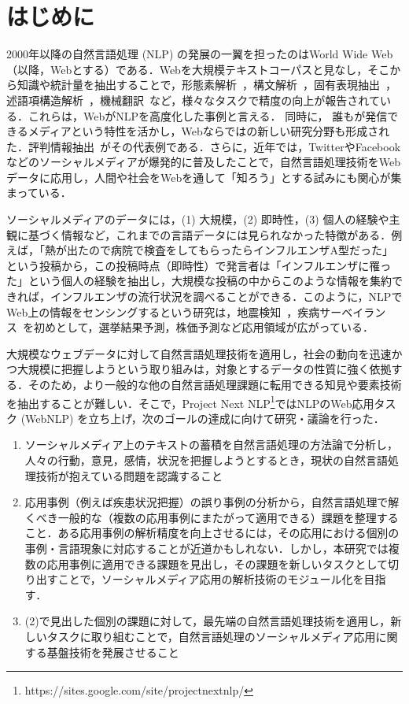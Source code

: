 \documentclass[japanese]{jnlp_1.4}
\begin{document}
\maketitle


\section{はじめに}

2000年以降の自然言語処理 (NLP) の発展の一翼を担ったのはWorld Wide Web（以降，Webとする）である．Webを大規模テキストコーパスと見なし，そこから知識や統計量を抽出することで，形態素解析~\cite{Kaji:2009,sato2015mecabipadicneologd}，構文解析~\cite{Kawahara:05}，固有表現抽出~\cite{Kazama:07}，述語項構造解析~\cite{Komachi:10,Sasano:10}，機械翻訳~\cite{Munteanu:06}など，様々なタスクで精度の向上が報告されている．これらは，WebがNLPを高度化した事例と言える．
同時に， 誰もが発信できるメディアという特性を活かし，Webならではの新しい研究分野も形成された．評判情報抽出~\cite{Pang:2002}がその代表例である．さらに，近年では，TwitterやFacebookなどのソーシャルメディアが爆発的に普及したことで，自然言語処理技術をWebデータに応用し，人間や社会をWebを通して「知ろう」とする試みにも関心が集まっている．

ソーシャルメディアのデータには，(1) 大規模，(2) 即時性，(3) 個人の経験や主観に基づく情報など，これまでの言語データには見られなかった特徴がある．例えば，「熱が出たので病院で検査をしてもらったらインフルエンザA型だった」という投稿から，この投稿時点（即時性）で発言者は「インフルエンザに罹った」という個人の経験を抽出し，大規模な投稿の中からこのような情報を集約できれば，インフルエンザの流行状況を調べることができる．このように，NLPでWeb上の情報をセンシングするという研究は，地震検知~\cite{Sakaki:10}，疾病サーベイランス~\cite{Culotta:2010}を初めとして，選挙結果予測，株価予測など応用領域が広がっている．

大規模なウェブデータに対して自然言語処理技術を適用し，社会の動向を迅速かつ大規模に把握しようという取り組みは，対象とするデータの性質に強く依拠する．そのため，より一般的な他の自然言語処理課題に転用できる知見や要素技術を抽出することが難しい．そこで，Project Next NLP\footnote{https://sites.google.com/site/projectnextnlp/}ではNLPのWeb応用タスク (WebNLP) を立ち上げ，次のゴールの達成に向けて研究・議論を行った．

\begin{enumerate}
\item ソーシャルメディア上のテキストの蓄積を自然言語処理の方法論で分析し，人々の行動，意見，感情，状況を把握しようとするとき，現状の自然言語処理技術が抱えている問題を認識すること
\item 応用事例（例えば疾患状況把握）の誤り事例の分析から，自然言語処理で解くべき一般的な（複数の応用事例にまたがって適用できる）課題を整理すること．ある応用事例の解析精度を向上させるには，その応用における個別の事例・言語現象に対応することが近道かもしれない．しかし，本研究では複数の応用事例に適用できる課題を見出し，その課題を新しいタスクとして切り出すことで，ソーシャルメディア応用の解析技術のモジュール化を目指す．
\item (2)で見出した個別の課題に対して，最先端の自然言語処理技術を適用し，新しいタスクに取り組むことで，自然言語処理のソーシャルメディア応用に関する基盤技術を発展させること
\end{enumerate}
\end{document}
